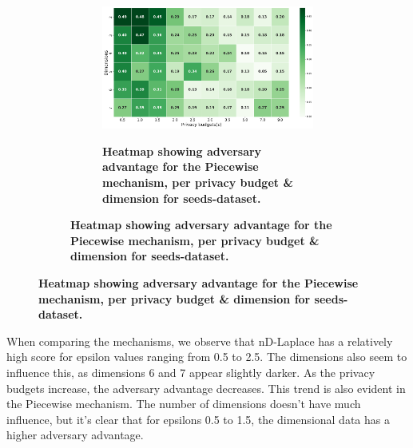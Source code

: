 {\begin{figure}[H]
\begin{subfigure}[b]{0.75\textwidth}
    \begin{subfigure}[c]{1\textwidth}
      \caption{\textbf{Heatmap showing adversary advantage for the Piecewise mechanism, per privacy budget \& dimension for seeds-dataset.}}
      \includegraphics[width=1\textwidth]{Results/nd-laplace/piecewise/seeds-dataset/shokri_mi_adv.png}
      \label{fig:privacy_seeds-dataset_adversial_advantage_piecewise}
    \end{subfigure}
  \end{subfigure}
\end{figure}
When comparing the mechanisms, we observe that nD-Laplace has a relatively high score for epsilon values ranging from 0.5 to 2.5. The dimensions also seem to influence this, as dimensions 6 and 7 appear slightly darker. As the privacy budgets increase, the adversary advantage decreases. This trend is also evident in the Piecewise mechanism. The number of dimensions doesn't have much influence, but it's clear that for epsilons 0.5 to 1.5, the dimensional data has a higher adversary advantage.

}
